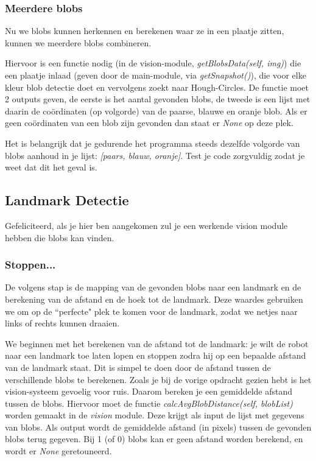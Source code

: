 \documentclass[a4paper]{article}
\begin{document}
\subsubsection{Meerdere blobs}
Nu we blobs kunnen herkennen en berekenen waar ze in een plaatje zitten, kunnen we meerdere blobs combineren.

Hiervoor is een functie nodig (in de vision-module, \textit{getBlobsData(self, img)}) die een plaatje inlaad (geven door de main-module, via \textit{getSnapshot()}), die voor elke kleur blob detectie doet en vervolgens zoekt  naar Hough-Circles. De functie moet 2 outputs geven, de eerste is het aantal gevonden blobs, de tweede is een lijst met daarin de co\"ordinaten (op volgorde) van de paarse, blauwe en oranje blob. Als er geen co\"ordinaten van een blob zijn gevonden dan staat er \textit{None} op deze plek. 

Het is belangrijk dat je gedurende het programma steeds dezelfde volgorde van blobs aanhoud in je lijst: \textit{[paars, blauw, oranje]}. Test je code zorgvuldig zodat je weet dat dit het geval is.

\subsection{Landmark Detectie}
Gefeliciteerd, als je hier ben aangekomen zul je een werkende vision module hebben die blobs kan vinden.

\subsubsection{Stoppen...}
De volgens stap is de mapping van de gevonden blobs naar een landmark en de berekening van de afstand en de hoek tot de landmark. Deze waardes gebruiken we om op de ``perfecte" plek te komen voor de landmark, zodat we netjes naar links of rechts kunnen draaien.

We beginnen met het berekenen van de afstand tot de landmark: je wilt de robot naar een landmark toe laten lopen en stoppen zodra hij op een bepaalde afstand van de landmark staat. Dit is simpel te doen door de afstand tussen de verschillende blobs te berekenen. Zoals je bij de vorige opdracht gezien hebt is het vision-systeem gevoelig voor ruis. Daarom bereken je een gemiddelde afstand tussen de blobs. Hiervoor moet de functie \textit{calcAvgBlobDistance(self, blobList)} worden gemaakt in de \textit{vision} module. Deze krijgt als input de lijst met gegevens van blobs. Als output wordt de gemiddelde afstand (in pixels) tussen de gevonden blobs terug gegeven. Bij 1 (of 0) blobs kan er geen afstand worden berekend, en wordt er \textit{None} geretouneerd.
\end{document}
